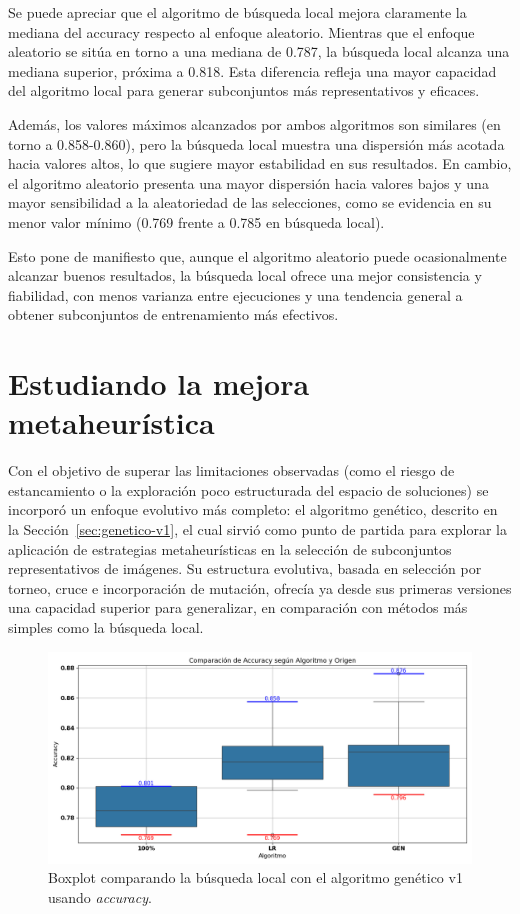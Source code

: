 Se puede apreciar que el algoritmo de búsqueda local mejora claramente la mediana del accuracy respecto al enfoque aleatorio.
Mientras que el enfoque aleatorio se sitúa en torno a una mediana de 0.787, la búsqueda local alcanza una mediana superior, próxima a 0.818.
Esta diferencia refleja una mayor capacidad del algoritmo local para generar subconjuntos más representativos y eficaces.

Además, los valores máximos alcanzados por ambos algoritmos son similares (en torno a 0.858-0.860),
pero la búsqueda local muestra una dispersión más acotada hacia valores altos, lo que sugiere mayor estabilidad en sus resultados.
En cambio, el algoritmo aleatorio presenta una mayor dispersión hacia valores bajos y una mayor sensibilidad a la aleatoriedad de las selecciones,
como se evidencia en su menor valor mínimo (0.769 frente a 0.785 en búsqueda local).

Esto pone de manifiesto que, aunque el algoritmo aleatorio puede ocasionalmente alcanzar buenos resultados,
la búsqueda local ofrece una mejor consistencia y fiabilidad, con menos varianza entre ejecuciones y una tendencia general a obtener subconjuntos de entrenamiento más efectivos.


\section{Estudiando la mejora metaheurística}\label{sec:estudio-mejora-metaheuristica}
Con el objetivo de superar las limitaciones observadas (como el riesgo de estancamiento o la exploración poco estructurada del espacio de soluciones)
se incorporó un enfoque evolutivo más completo: el algoritmo genético, descrito en la Sección~\ref{sec:genetico-v1}, el cual sirvió como punto de partida para explorar la
aplicación de estrategias metaheurísticas en la selección de subconjuntos representativos de imágenes.
Su estructura evolutiva, basada en selección por torneo, cruce e incorporación de mutación,
ofrecía ya desde sus primeras versiones una capacidad superior para generalizar, en comparación con métodos más simples como la búsqueda local.

\begin{figure}[H]
    \centering
    \includegraphics[width=1\textwidth]{imagenes/evaluaciones/comparacion_bl-gen_v1}
    \caption{Boxplot comparando la búsqueda local con el algoritmo genético v1 usando \textit{accuracy}.}
    \label{fig:bl-vs-gen-v1}
\end{figure}

